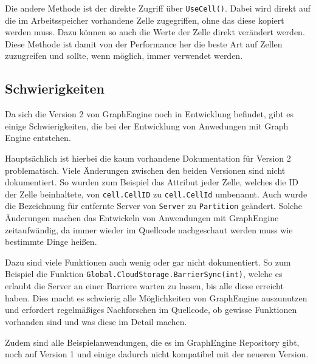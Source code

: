 Die andere Methode ist der direkte Zugriff über \verb|UseCell()|. Dabei wird direkt auf die im Arbeitsspeicher vorhandene Zelle zugegriffen, ohne das diese kopiert werden muss. Dazu können so auch die Werte der Zelle direkt verändert werden. Diese Methode ist damit von der Performance her die beste Art auf Zellen zuzugreifen und sollte, wenn möglich, immer verwendet werden.



\subsection{Schwierigkeiten}

Da sich die Version 2 von GraphEngine noch in Entwicklung befindet, gibt es einige Schwierigkeiten, die bei der Entwicklung von Anwedungen mit Graph Engine entstehen.

Hauptsächlich ist hierbei die kaum vorhandene Dokumentation für Version 2 problematisch. Viele Änderungen zwischen den beiden Versionen sind nicht dokumentiert. So wurden zum Beispiel
das Attribut jeder Zelle, welches die ID der Zelle beinhaltete, von \verb|cell.CellID| zu \verb|cell.CellId| umbenannt. Auch wurde die Bezeichnung für entfernte Server von \verb|Server| zu \verb|Partition| geändert.
Solche Änderungen machen das Entwickeln von Anwendungen mit GraphEngine zeitaufwändig, da immer wieder im Quellcode nachgeschaut werden muss wie bestimmte Dinge heißen. 

Dazu sind viele Funktionen auch wenig oder gar nicht dokumentiert. So zum Beispiel die Funktion \verb|Global.CloudStorage.BarrierSync(int)|, welche es erlaubt die Server an einer Barriere warten zu lassen, bis alle diese erreicht haben.
Dies macht es schwierig alle Möglichkeiten von GraphEngine auszunutzen und erfordert regelmäßiges Nachforschen im Quellcode, ob gewisse Funktionen vorhanden sind und was diese im Detail machen.

Zudem sind alle Beispielanwendungen, die es im GraphEngine Repository gibt, noch auf Version 1 und einige dadurch nicht kompatibel mit der neueren Version.


